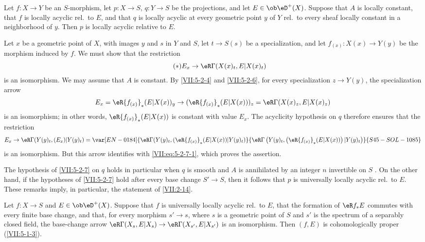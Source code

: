 \begin{corollary}\label{VII:5-2-7}
Let $f:X\to Y$ be an $S$-morphism, let $p:X\to S$, $q:Y\to S$ be the
projections, and let $E\in\ob\eD^+(X)$. Suppose that $A$ is locally constant,
that $f$ is locally acyclic rel.\ to $E$, and that $q$ is locally acyclic at
every geometric point $y$ of $Y$ rel.\ to every sheaf locally constant
in a neighborhood of $y$. Then $p$ is locally acyclic relative to $E$.
\end{corollary}

Let $x$ be a geometric point of $X$, with images $y$ and $s$ in $Y$ and $S$,
let $t\to S(s)$ be a specialization, and let
$f_{(x)}:X(x)\to Y(y)$ be the morphism induced by $f$. We must show that the
restriction
\begin{equation*}\tag{$*$}\label{VII:eq:5-2-7-1}
  E_x \to \eR\Gamma(X(x)_t,E|X(x)_t) 
\end{equation*}
is an isomorphism. We may assume that $A$ is constant. By \ref{VII:5-2-4} and
\ref{VII:5-2-6}, for every specialization $z\to Y(y)$, the specialization
arrow
\[
  E_x = \eR {f_{(x)}}_\ast (E|X(x))_y \to (\eR {f_{(x)}}_\ast (E|X(x)))_z = \eR\Gamma(X(x)_z,E|X(x)_z) 
\]
is an isomorphism; in other words, $\eR{f_{(x)}}_\ast(E|X(x))$ is constant
with value $E_x$. The acyclicity hypothesis on $q$ therefore ensures that the restriction
\[
  E_x \to \eR\Gamma(Y(y)_t,(E_x)|Y(y)_t) = \var[EN-0184]{\eR\Gamma(Y(y)_t,(\eR {f_{(x)}}_\ast (E|X(x))|Y(y)_t)}{\eR\Gamma\left(Y(y)_t,\left(\eR {f_{(x)}}_\ast (E|X(x))\right)|Y(y)_t\right)}{S45-SOL-1085}
\]
is an isomorphism. But this arrow identifies with
\eqref{VII:eq:5-2-7-1}, which proves the assertion.

The hypothesis of \ref{VII:5-2-7} on $q$ holds in particular when $q$ is
smooth and $A$ is annihilated by an integer $n$ invertible on $S$
. On the other hand, if the hypotheses of \ref{VII:5-2-7} hold
after every base change $S'\to S$, then it follows that $p$ is universally
locally acyclic rel.\ to $E$. These remarks imply, in particular, the
statement of \ref{VII:2-14}.






\begin{corollary}\label{VII:5-2-8}
Let $f:X\to S$ and $E\in \ob\eD^+(X)$. Suppose that $f$ is universally locally
acyclic rel.\ to $E$, that the formation of $\eR f_\ast E$ commutes with
every finite base change, and that, for every morphism $s'\to s$, where $s$ is
a geometric point of $S$ and $s'$ is the spectrum of a separably closed
field, the base-change arrow
$\eR\Gamma(X_s,E|X_s)\to \eR\Gamma(X_{s'},E|X_{s'})$ is an isomorphism. Then
$(f,E)$ is cohomologically proper (\ref{VII:5-1-3}).
\end{corollary}

